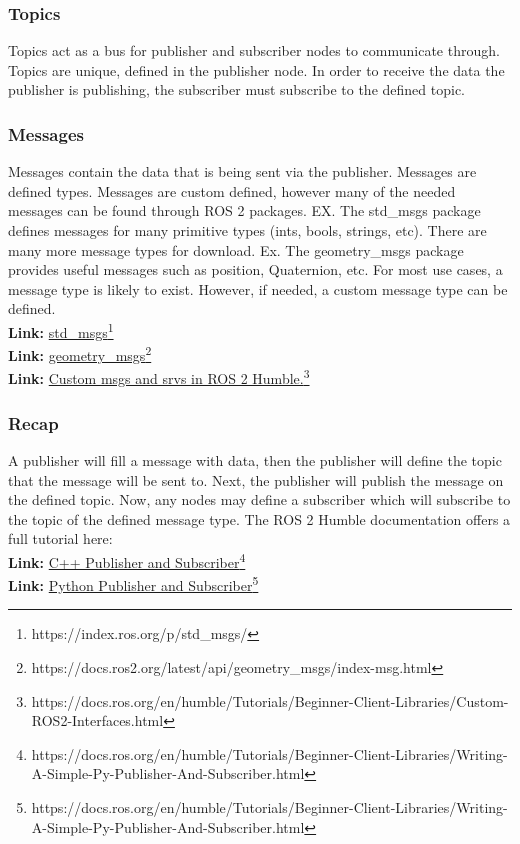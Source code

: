 \documentclass[11pt]{article}
\newcommand{\link}[2]{\textbf{Link: }\textcolor{blue}{\href{#2}{#1}}\footnote{#2}}
\begin{document}
\subsubsection{Topics}
Topics act as a bus for publisher and subscriber nodes to communicate through. Topics are unique, defined in the publisher node. In order to receive the data the publisher is publishing, the subscriber must subscribe to the defined topic.

\subsubsection{Messages}
Messages contain the data that is being sent via the publisher. Messages are defined types. Messages are custom defined, however many of the needed messages can be found through ROS 2 packages. EX. The std\_msgs package defines messages for many primitive types (ints, bools, strings, etc). There are many more message types for download. Ex. The geometry\_msgs package provides useful messages such as position, Quaternion, etc. For most use cases, a message type is likely to exist. However, if needed, a custom message type can be defined.\\
\link{std\_msgs}{https://index.ros.org/p/std\_msgs/}\\
\link{geometry\_msgs}{https://docs.ros2.org/latest/api/geometry\_msgs/index-msg.html}\\
\link{Custom msgs and srvs in ROS 2 Humble.}{https://docs.ros.org/en/humble/Tutorials/Beginner-Client-Libraries/Custom-ROS2-Interfaces.html}


\subsubsection{Recap}
A publisher will fill a message with data, then the publisher will define the topic that the message will be sent to. Next, the publisher will publish the message on the defined topic. Now, any nodes may define a subscriber which will subscribe to the topic of the defined message type. The ROS 2 Humble documentation offers a full tutorial here: \\
\link{C++ Publisher and Subscriber}{https://docs.ros.org/en/humble/Tutorials/Beginner-Client-Libraries/Writing-A-Simple-Py-Publisher-And-Subscriber.html}\\
\link{Python Publisher and Subscriber}{https://docs.ros.org/en/humble/Tutorials/Beginner-Client-Libraries/Writing-A-Simple-Py-Publisher-And-Subscriber.html}
\end{document}
